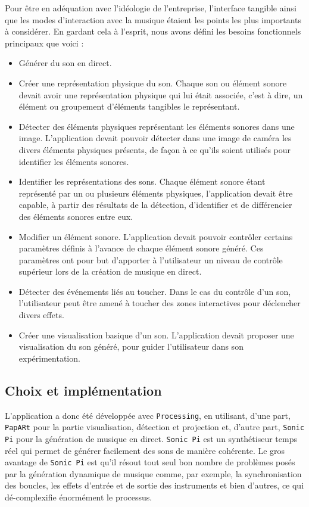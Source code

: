 Pour être en adéquation avec l'idéologie de l'entreprise, l'interface tangible ainsi que les modes d'interaction avec la musique étaient les points les plus importants à considérer. En gardant cela à l'esprit, nous avons défini les besoins fonctionnels principaux que voici :
\begin{itemize}
\item Générer du son en direct.
\item Créer une représentation physique du son. Chaque son ou élément sonore devait avoir une représentation physique qui lui était associée, c'est à dire, un élément ou groupement d'éléments tangibles le représentant.
\item Détecter des éléments physiques représentant les éléments sonores dans une image. L'application devait pouvoir détecter dans une image de caméra les divers éléments physiques présents, de façon à ce qu'ils soient utilisés pour identifier les éléments sonores.
\item Identifier les représentations des sons. Chaque élément sonore étant représenté par un ou plusieurs éléments physiques, l'application devait être capable, à partir des résultats de la détection, d'identifier et de différencier des éléments sonores entre eux. 
\item Modifier un élément sonore. L'application devait pouvoir contrôler certains paramètres définis à l'avance de chaque élément sonore généré. Ces paramètres ont pour but d'apporter à l'utilisateur un niveau de contrôle supérieur lors de la création de musique en direct.
\item Détecter des événements liés au toucher. Dans le cas du contrôle d'un son, l'utilisateur peut être amené à toucher des zones interactives pour déclencher divers effets.
\item Créer une visualisation basique d'un son. L'application devait proposer une visualisation du son généré, pour guider l'utilisateur dans son expérimentation.
\end{itemize}

\subsection{Choix et implémentation}
\label{subsec:reartable:impl}
L'application a donc été développée avec \texttt{Processing}, en utilisant, d'une part, \texttt{PapARt} pour la partie visualisation, détection et projection et, d'autre part, \texttt{Sonic Pi}\cite{sonicpi} pour la génération de musique en direct.
\texttt{Sonic Pi} est un synthétiseur temps réel qui permet de générer facilement des sons de manière cohérente. Le gros avantage de \texttt{Sonic Pi} est qu'il résout tout seul bon nombre de problèmes posés par la génération dynamique de musique comme, par exemple, la synchronisation des boucles, les effets d'entrée et de sortie des instruments et bien d'autres, ce qui dé-complexifie énormément le processus.

